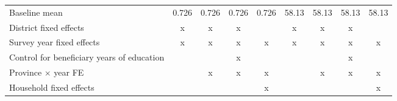 {\begin{tabular}{l*{8}{c}}
Baseline mean       &       0.726         &       0.726         &       0.726         &       0.726         &       58.13         &       58.13         &       58.13         &       58.13         \\
District fixed effects&           x         &           x         &           x         &                     &           x         &           x         &           x         &                     \\
Survey year fixed effects&           x         &           x         &           x         &           x         &           x         &           x         &           x         &           x         \\
Control for beneficiary years of education&                     &                     &           x         &                     &                     &                     &           x         &                     \\
Province $\times$  year FE&                     &           x         &           x         &           x         &                     &           x         &           x         &           x         \\
Household fixed effects&                     &                     &                     &           x         &                     &                     &                     &           x         \\
\bottomrule
\end{tabular}
}
